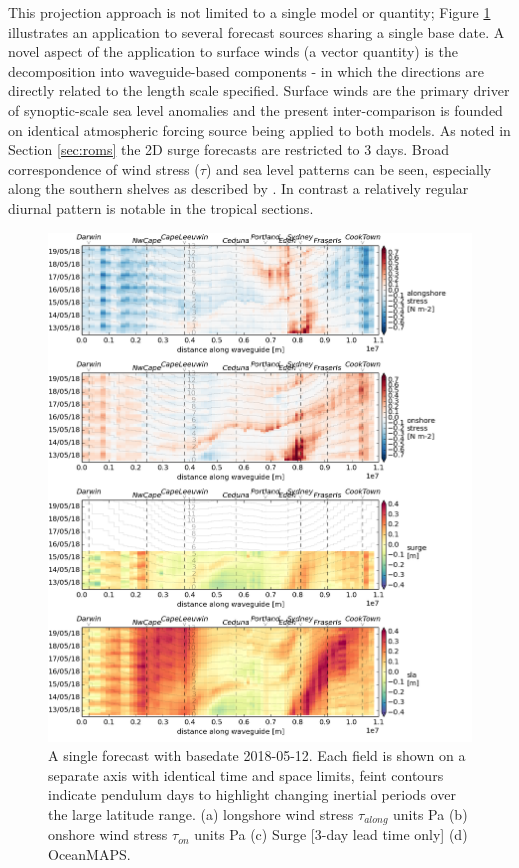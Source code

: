 This projection approach is not limited to a single model or quantity; Figure \ref{fig:collate_g} illustrates an application to several forecast sources sharing a single base date.
A novel aspect of the application to surface winds (a vector quantity) is the decomposition into waveguide-based components - in which the directions are directly related to the length scale specified.
Surface winds are the primary driver of synoptic-scale sea level anomalies and the present inter-comparison is founded on identical atmospheric forcing source being applied to both models. As noted in Section \ref{sec:roms} the 2D surge forecasts are restricted to 3 days.
Broad correspondence of wind stress ($\tau$) and sea level patterns can be seen, especially along the southern shelves as described by \cite{McInnes:2003vl}.
In contrast a relatively regular diurnal pattern is notable in the tropical sections.
\begin{figure}[H]\centering
    \noindent\includegraphics[width=\figwidthFull]{figures/plots/collate_g.png}
    \caption[Forecast with basedate 2018-05-12]
            {A single forecast with basedate 2018-05-12.  Each field is shown on a separate axis with identical time and space limits, feint contours indicate pendulum days to highlight changing inertial periods over the large latitude range. (a) longshore wind stress $\tau_{along}$ units Pa (b) onshore wind stress $\tau_{on}$ units Pa (c) Surge [3-day lead time only] (d) OceanMAPS.}
    \label{fig:collate_g}
\end{figure}  
